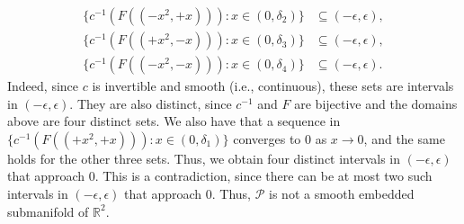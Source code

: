 \documentclass[12pt,dvipdfmx]{article}
\theoremstyle{plain}
\begin{document}
{\begin{align*}
        \{ c^{-1}(F((-x^2, +x))) : x \in (0, \delta_2) \} & \subseteq (-\epsilon, \epsilon), \\
        \{ c^{-1}(F((+x^2, -x))) : x \in (0, \delta_3) \} & \subseteq (-\epsilon, \epsilon), \\
        \{ c^{-1}(F((-x^2, -x))) : x \in (0, \delta_4) \} & \subseteq (-\epsilon, \epsilon).
    \end{align*}
    Indeed, since $c$ is invertible and smooth (i.e., continuous), these sets are intervals in $(-\epsilon, \epsilon)$. They are also distinct, since $c^{-1}$ and $F$ are bijective and the domains above are four distinct sets.
    We also have that a sequence in $\{ c^{-1}(F((+x^2, +x))) : x \in (0, \delta_1) \}$ converges to $0$ as $x \to 0$, and the same holds for the other three sets. Thus, we obtain four distinct intervals in $(-\epsilon, \epsilon)$ that approach $0$. This is a contradiction, since there can be at most two such intervals in $(-\epsilon, \epsilon)$ that approach $0$. Thus, $\mathcal{P}$ is not a smooth embedded submanifold of $\mathbb{R}^2$.
}


\end{document}
